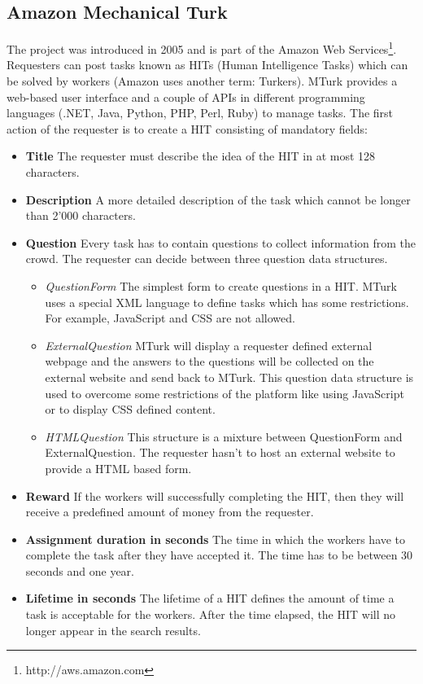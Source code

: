 \subsection{Amazon Mechanical Turk}
The project was introduced in 2005 and is part of the Amazon Web Services\footnote{http://aws.amazon.com}. Requesters can post tasks known as HITs (Human Intelligence Tasks) which can be solved by workers (Amazon uses another term: Turkers). MTurk provides a web-based user interface and a couple of APIs in different programming languages (.NET, Java, Python, PHP, Perl, Ruby) to manage tasks. The first action of the requester is to create a HIT consisting of mandatory fields: 
\begin{itemize}
	\item \textbf{Title} The requester must describe the idea of the HIT in at most 128 characters. 
	\item \textbf{Description} A more detailed description of the task which cannot be longer than 2'000 characters. 
	\item \textbf{Question} Every task has to contain questions to collect information from the crowd. The requester can decide between three question data structures. 
	\begin{itemize}
		\item \textit{QuestionForm} The simplest form to create questions in a HIT. MTurk uses a special XML language to define tasks which has some restrictions. For example, JavaScript and CSS are not allowed. 
		\item \textit{ExternalQuestion} MTurk will display a requester defined external webpage and the answers to the questions will be collected on the external website and send back to MTurk. This question data structure is used to overcome some restrictions of the platform like using JavaScript or to display CSS defined content. 
		\item \textit{HTMLQuestion} This structure is a mixture between QuestionForm and ExternalQuestion. The requester hasn't to host an external website to provide a HTML based form. 
	\end{itemize}
	\item \textbf{Reward} If the workers will successfully completing the HIT, then they will receive a predefined amount of money from the requester. 
	\item \textbf{Assignment duration in seconds} The time in which the workers have to complete the task after they have accepted it. The time has to be between 30 seconds and one year. 
	\item \textbf{Lifetime in seconds} The lifetime of a HIT defines the amount of time a task is acceptable for the workers. After the time elapsed, the HIT will no longer appear in the search results.
\end{itemize}
